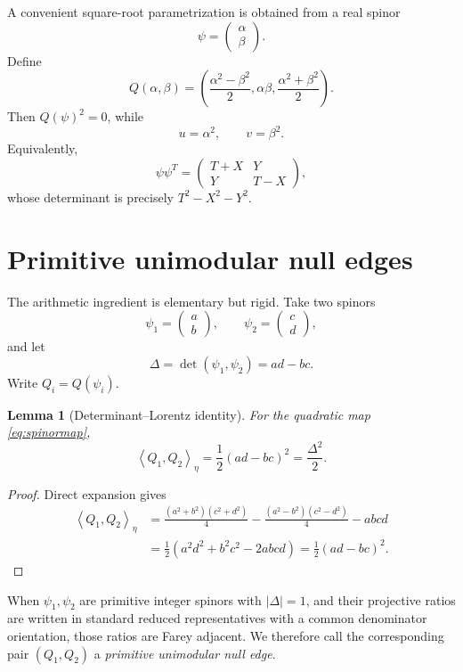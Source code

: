 \documentclass[11pt]{article}
\newtheorem{lemma}[theorem]{Lemma}
\theoremstyle{remark}
\newcommand{\ip}[2]{\left\langle #1,#2\right\rangle_\eta}
\begin{document}
A convenient square-root parametrization is obtained from a real spinor
\[
\psi=
\begin{pmatrix}\alpha\\ \beta\end{pmatrix}.
\]
Define
\begin{equation}
Q(\alpha,\beta)
=
\left(
\frac{\alpha^2-\beta^2}{2},
\alpha\beta,
\frac{\alpha^2+\beta^2}{2}
\right).
\label{eq:spinormap}
\end{equation}
Then $Q(\psi)^2=0$, while
\[
u=\alpha^2,\qquad v=\beta^2.
\]
Equivalently,
\[
\psi\psi^T
=
\begin{pmatrix}
T+X&Y\\
Y&T-X
\end{pmatrix},
\]
whose determinant is precisely $T^2-X^2-Y^2$.

\section{Primitive unimodular null edges}

The arithmetic ingredient is elementary but rigid.  Take two spinors
\[
\psi_1=\begin{pmatrix}a\\b\end{pmatrix},
\qquad
\psi_2=\begin{pmatrix}c\\d\end{pmatrix},
\]
and let
\[
\Delta=\det(\psi_1,\psi_2)=ad-bc.
\]
Write $Q_i=Q(\psi_i)$.

\begin{lemma}[Determinant--Lorentz identity]
\label{lem:detlor}
For the quadratic map \eqref{eq:spinormap},
\[
\boxed{
\ip{Q_1}{Q_2}
=
\frac12(ad-bc)^2
=
\frac{\Delta^2}{2}.
}
\]
\end{lemma}

\begin{proof}
Direct expansion gives
\begin{align*}
\ip{Q_1}{Q_2}
&=
\frac{(a^2+b^2)(c^2+d^2)}{4}
-\frac{(a^2-b^2)(c^2-d^2)}{4}
-abcd\\
&=
\frac12(a^2d^2+b^2c^2-2abcd)
=
\frac12(ad-bc)^2.
\end{align*}
\end{proof}

When $\psi_1,\psi_2$ are primitive integer spinors with $|\Delta|=1$, and their projective ratios are written in standard reduced representatives with a common denominator orientation, those ratios are Farey adjacent.  We therefore call the corresponding pair $(Q_1,Q_2)$ a \emph{primitive unimodular null edge}.
\end{document}
